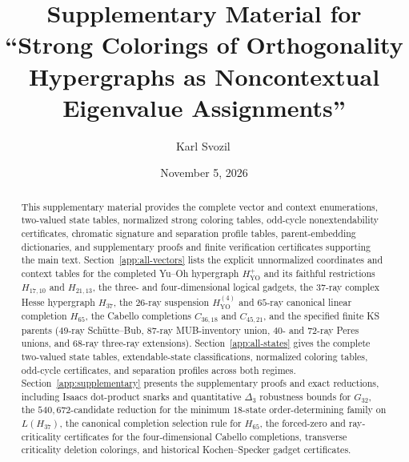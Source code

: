 \documentclass[aps,pra,reprint,superscriptaddress,longbibliography,nofootinbib,floatfix,10pt]{revtex4-2}
\theoremstyle{definition}
\newcommand{\YO}{\mathrm{YO}}
\begin{document}
\title{Supplementary Material for ``Strong Colorings of Orthogonality Hypergraphs as Noncontextual Eigenvalue Assignments''}

\author{Karl Svozil\,}

\date{November 5, 2026}

\begin{abstract}
This supplementary material provides the complete vector and context enumerations, two-valued state tables, normalized strong coloring tables, odd-cycle nonextendability certificates, chromatic signature and separation profile tables, parent-embedding dictionaries, and supplementary proofs and finite verification certificates supporting the main text. Section~\ref{app:all-vectors} lists the explicit unnormalized coordinates and context tables for the completed Yu--Oh hypergraph $H_{\YO}^{+}$ and its faithful restrictions $H_{17,10}$ and $H_{21,13}$, the three- and four-dimensional logical gadgets, the $37$-ray complex Hesse hypergraph $H_{37}$, the $26$-ray suspension $H_{\YO}^{(4)}$ and $65$-ray canonical linear completion $H_{65}$, the Cabello completions $C_{36,18}$ and $C_{45,21}$, and the specified finite KS parents ($49$-ray Sch\"utte--Bub, $87$-ray MUB-inventory union, $40$- and $72$-ray Peres unions, and $68$-ray three-ray extensions). Section~\ref{app:all-states} gives the complete two-valued state tables, extendable-state classifications, normalized coloring tables, odd-cycle certificates, and separation profiles across both regimes. Section~\ref{app:supplementary} presents the supplementary proofs and exact reductions, including Isaacs dot-product snarks and quantitative $\Delta_3$ robustness bounds for $G_{32}$, the $540{,}672$-candidate reduction for the minimum $18$-state order-determining family on $L(H_{37})$, the canonical completion selection rule for $H_{65}$, the forced-zero and ray-criticality certificates for the four-dimensional Cabello completions, transverse criticality deletion colorings, and historical Kochen--Specker gadget certificates.
\end{abstract}

\maketitle
\raggedbottom
\end{document}
